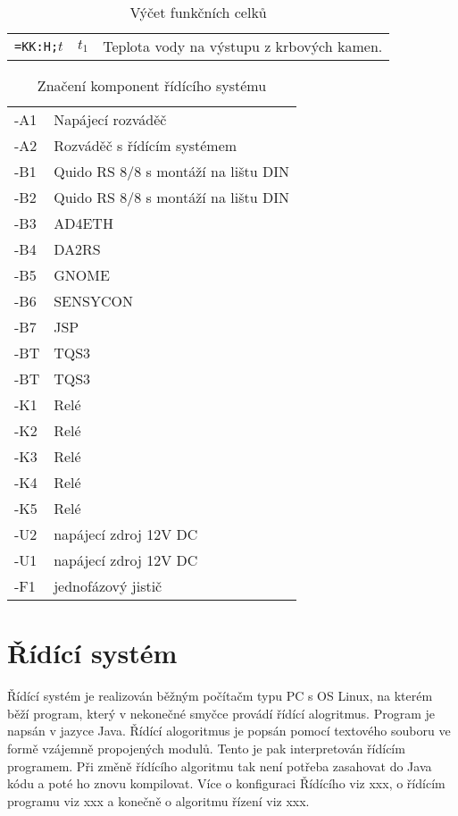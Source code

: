 \documentclass{book}
\begin{document}
\begin{table}[]
  \centering
    \begin{tabular}{ l l l}
        \texttt{=KK:H;}$t$\index{$t_1$|see {=KK:H;t}} & $t_1$ & Teplota vody na výstupu z krbových kamen.
    \end{tabular}
  \caption{Výčet funkčních celků}
  \label{tab:myfirsttable}
\end{table}


\begin{table}[]
  \centering
    \begin{tabular}{l l}
      -A1 & Napájecí rozváděč\\
      -A2 & Rozváděč s řídícím systémem\\
      -B1 & Quido RS 8/8 s montáží na lištu DIN\\
      -B2 & Quido RS 8/8 s montáží na lištu DIN\\
      -B3 & AD4ETH\\
      -B4 & DA2RS\\
      -B5 & GNOME\\
      -B6 & SENSYCON\\
      -B7 & JSP\\
      -BT & TQS3\\
      -BT & TQS3\\
      -K1 & Relé\\
      -K2 & Relé\\
      -K3 & Relé\\
      -K4 & Relé\\
      -K5 & Relé\\
      -U2 & napájecí zdroj 12V DC\\
      -U1 & napájecí zdroj 12V DC\\
      -F1 & jednofázový jistič
    \end{tabular}
  \caption{Značení komponent řídícího systému}
  \label{tab:CSLabels}
\end{table}


\chapter{Řídící systém}

    Řídící systém je realizován běžným počítačm typu PC s OS Linux, na kterém
    běží program, který v nekonečné smyčce provádí řídící alogritmus. Program
    je napsán v jazyce Java. Řídící alogoritmus je popsán pomocí textového
    souboru ve formě vzájemně propojených modulů. Tento je pak interpretován
    řídícím programem. Při změně řídícího algoritmu tak není potřeba zasahovat
    do Java kódu a poté ho znovu kompilovat. Více o konfiguraci Řídícího
    viz xxx, o řídícím programu viz xxx a konečně o algoritmu řízení viz xxx.
\end{document}
